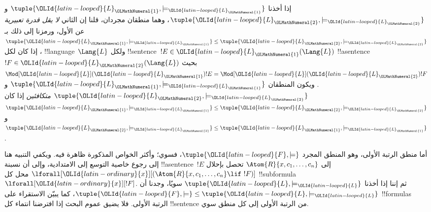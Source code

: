 \documentclass[../../../include/open-logic-section]{subfiles}
\begin{document}
\begin{defn}
إذا أخذنا $\tuple{\OLId{latin-looped}{L}_\OLMathNumeral{1},\models_{\OLId{latin-looped}{L}_\OLMathNumeral{1}}}$ و$\tuple{\OLId{latin-looped}{L}_\OLMathNumeral{2},\models_{\OLId{latin-looped}{L}_\OLMathNumeral{2}}}$، وهما منطقان
مجردان، قلنا إن الثاني \emph{لا يقل قدرة تعبيرية} عن الأول، ورمزنا إلى ذلك بـ
$\tuple{\OLId{latin-looped}{L}_\OLMathNumeral{1},\models_{\OLId{latin-looped}{L}_\OLMathNumeral{1}}} \leq \tuple{\OLId{latin-looped}{L}_\OLMathNumeral{2},\models_{\OLId{latin-looped}{L}_\OLMathNumeral{2}}}$، إذا كان
لكل !!{language}~$\Lang{L}$ ولكل !!{sentence}~$!E \in \OLId{latin-looped}{L}_\OLMathNumeral{1}(\Lang{L})$
!!a{sentence}~$!F \in \OLId{latin-looped}{L}_\OLMathNumeral{2}(\Lang{L})$ بحيث
$\Mod[\OLId{latin-looped}{L}](\OLId{latin-looped}{L}_\OLMathNumeral{1}){!E}=\Mod[\OLId{latin-looped}{L}](\OLId{latin-looped}{L}_\OLMathNumeral{2}){!F}$. ويكون المنطقان
$\tuple{\OLId{latin-looped}{L}_\OLMathNumeral{1},\models_{\OLId{latin-looped}{L}_\OLMathNumeral{1}}}$ و$\tuple{\OLId{latin-looped}{L}_\OLMathNumeral{2},\models_{\OLId{latin-looped}{L}_\OLMathNumeral{2}}}$
\emph{متكافئين} إذا كان
$\tuple{\OLId{latin-looped}{L}_\OLMathNumeral{1},\models_{\OLId{latin-looped}{L}_\OLMathNumeral{1}}} \leq \tuple{\OLId{latin-looped}{L}_\OLMathNumeral{2},\models_{\OLId{latin-looped}{L}_\OLMathNumeral{2}}}$ و
$\tuple{\OLId{latin-looped}{L}_\OLMathNumeral{2},\models_{\OLId{latin-looped}{L}_\OLMathNumeral{2}}} \leq \tuple{\OLId{latin-looped}{L}_\OLMathNumeral{1},\models_{\OLId{latin-looped}{L}_\OLMathNumeral{1}}}$.
\end{defn}

\begin{rem}
  أما منطق الرتبة الأولى، وهو المنطق المجرد $\tuple{\OLId{latin-looped}{F},\models}$، فسوي؛
  وأكثر الخواص المذكورة ظاهرة فيه. ويكفي التنبيه هنا إلى
  رجوع خاصية التوسع إلى الامتدادية، وإلى أن نسبنة !!a{sentence}~$!E$ إلى
  $\Atom{R}{x,c_1,\dots,c_n}$ تحصل بإحلال
  $\lforall[\OLId{latin-ordinary}{x}][(\Atom{R}{x,c_1,\dots,c_n} \lif \ !F)]$ محل كل
  !!{subformula}~$\lforall[\OLId{latin-ordinary}{x}][!F]$. ثم إننا إذا أخذنا
  $\tuple{\OLId{latin-looped}{L},\models_\OLId{latin-looped}{L}}$ سويًا، وجدنا أن
  $\tuple{\OLId{latin-looped}{F},\models} \leq \tuple{\OLId{latin-looped}{L},\models_\OLId{latin-looped}{L}}$، كما يبيّن الاستقراء على
  !!{formula}s الرتبة الأولى. فلا يضيق عموم البحث إذا افترضنا
  انتماء كل !!{sentence} من الرتبة الأولى إلى كل منطق سوي.
\end{rem}
\end{document}
